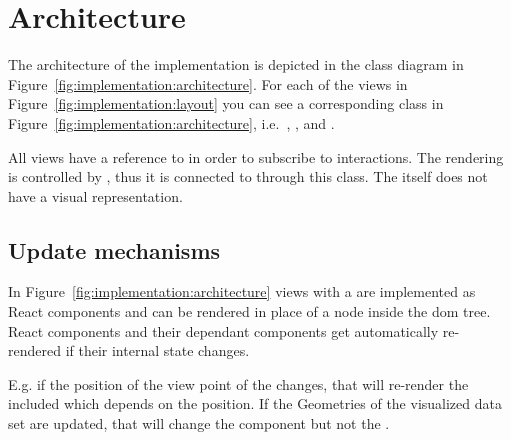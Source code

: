 


\section{Architecture}
The architecture of the implementation is depicted in the class diagram in Figure~\ref{fig:implementation:architecture}.
For each of the views in Figure~\ref{fig:implementation:layout} you can see a corresponding class in Figure~\ref{fig:implementation:architecture}, i.e.\ , ,  and .

All views have a reference to  in order to subscribe to interactions.
The rendering \tmap{} is controlled by , thus it is connected to  through this class.
The  itself does not have a visual representation.

\subsection{Update mechanisms}
In Figure~\ref{fig:implementation:architecture} views with a  are implemented as React components and can be rendered in place of a node inside the \gls{dom} tree.
React components and their dependant components get automatically re-rendered if their internal state changes.

E.g. if the position of the view point of the  changes, that will re-render the included  which depends on the position.
If the Geometries of the visualized data set are updated, that will change the  component but not the .



